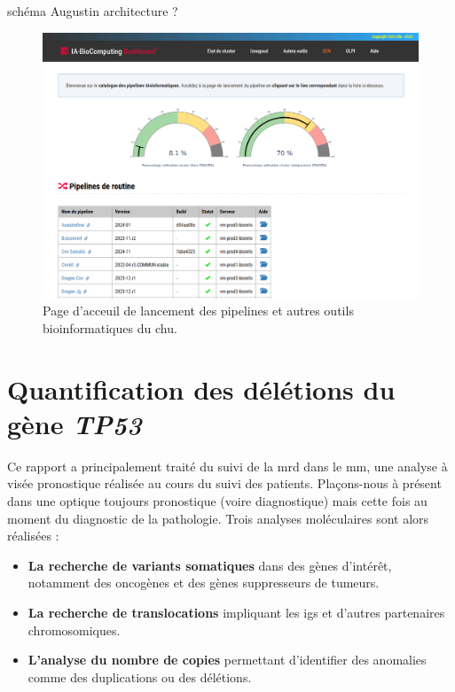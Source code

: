 schéma Augustin architecture ? 

\begin{figure}[H]
    \centering
    \includegraphics[width=1\textwidth]{images/dashboard_bioinfo.png}
    \caption{
        Page d'acceuil de lancement des pipelines et autres outils bioinformatiques du \gls{chu}.
    }
    \label{fig:bioinfo-dashboard}
\end{figure}

\section{Quantification des délétions du gène \textit{TP53}}

Ce rapport a principalement traité du suivi de la \gls{mrd} dans le \gls{mm}, une analyse à visée pronostique réalisée au cours du suivi des patients.
Plaçons-nous à présent dans une optique toujours pronostique (voire diagnostique) mais cette fois au moment du diagnostic de la pathologie. 
Trois analyses moléculaires sont alors réalisées :

\begin{itemize}
    \item \textbf{La recherche de variants somatiques} dans des gènes d'intérêt, notamment des oncogènes et des gènes suppresseurs de tumeurs.
    \item \textbf{La recherche de translocations} impliquant les \glspl{ig} et d'autres partenaires chromosomiques.
    \item \textbf{L'analyse du nombre de copies} permettant d'identifier des anomalies comme des duplications ou des délétions.
\end{itemize}

